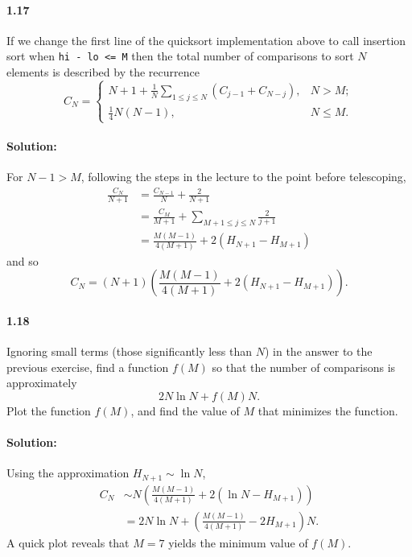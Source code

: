\documentclass{article}
\begin{document}
\paragraph{1.17} If we change the first line of the quicksort implementation
above to call insertion sort when \verb|hi - lo <= M| then the total number of
comparisons to sort $N$ elements is described by the recurrence
\begin{equation*}
  C_N = \begin{cases}
    N + 1 + \frac{1}{N}\sum_{1 \leq j \leq N}(C_{j - 1} + C_{N - j}), &N > M;
      \\
    \frac{1}{4}N(N - 1), &N \leq M.
  \end{cases}
\end{equation*}

\paragraph{Solution:} For $N - 1 > M$, following the steps in the lecture to
the point before telescoping, \begin{align*}
  \frac{C_N}{N + 1} &= \frac{C_{N - 1}}{N} + \frac{2}{N + 1} \\
    &= \frac{C_M}{M + 1} + \sum_{M + 1 \leq j \leq N}\frac{2}{j + 1} \\
    &= \frac{M(M - 1)}{4(M + 1)} + 2(H_{N + 1} - H_{M + 1})
\end{align*} and so \begin{equation*}
  C_N = (N + 1)\left(\frac{M(M - 1)}{4(M + 1)} + 2(H_{N + 1} - H_{M + 1})
    \right).
\end{equation*}

\paragraph{1.18} Ignoring small terms (those significantly less than $N$) in
the answer to the previous exercise, find a function $f(M)$ so that the number
of comparisons is approximately \begin{equation*}
  2N\ln N + f(M)N.
\end{equation*}
Plot the function $f(M)$, and find the value of $M$ that minimizes the
function.

\paragraph{Solution:} Using the approximation $H_{N + 1} \sim \ln N$,
\begin{align*}
  C_N &\sim N\left(\frac{M(M - 1)}{4(M + 1)} + 2(\ln N - H_{M + 1})\right)
    \\
    &= 2N\ln N + \left(\frac{M(M - 1)}{4(M + 1)} - 2H_{M + 1}\right)N.
\end{align*}
A quick plot reveals that $M = 7$ yields the minimum value of $f(M)$.
\end{document}
